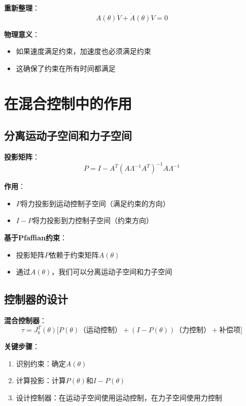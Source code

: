 \documentclass[12pt,a4paper]{article}
\begin{document}
\textbf{重新整理}：
\begin{equation}
A(\theta)\dot{V} + \dot{A}(\theta)V = 0
\end{equation}

\textbf{物理意义}：
\begin{itemize}
\item 如果速度满足约束，加速度也必须满足约束
\item 这确保了约束在所有时间都满足
\end{itemize}

\section{在混合控制中的作用}

\subsection{分离运动子空间和力子空间}

\textbf{投影矩阵}：
\begin{equation}
P = I - A^T(A\Lambda^{-1}A^T)^{-1}A\Lambda^{-1}
\end{equation}

\textbf{作用}：
\begin{itemize}
\item $P$将力投影到运动控制子空间（满足约束的方向）
\item $I - P$将力投影到力控制子空间（约束方向）
\end{itemize}

\textbf{基于Pfaffian约束}：
\begin{itemize}
\item 投影矩阵$P$依赖于约束矩阵$A(\theta)$
\item 通过$A(\theta)$，我们可以分离运动子空间和力子空间
\end{itemize}

\subsection{控制器的设计}

\textbf{混合控制器}：
\begin{equation}
\tau = J_b^T(\theta)\Bigg[P(\theta)\text{（运动控制）} + (I - P(\theta))\text{（力控制）} + \text{补偿项}\Bigg]
\end{equation}

\textbf{关键步骤}：
\begin{enumerate}
\item 识别约束：确定$A(\theta)$
\item 计算投影：计算$P(\theta)$和$I - P(\theta)$
\item 设计控制器：在运动子空间使用运动控制，在力子空间使用力控制
\end{enumerate}
\end{document}
